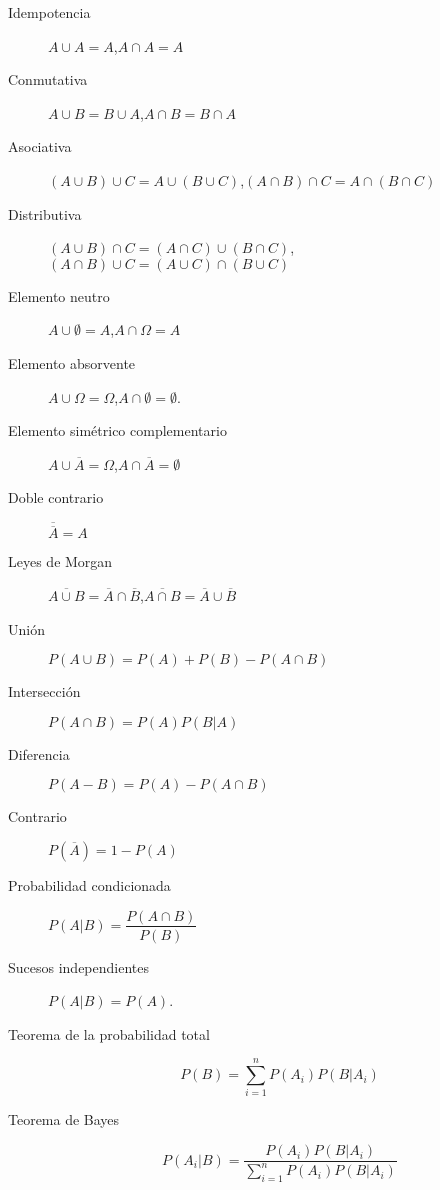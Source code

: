 \begin{multicols*}{2}
\begin{tcolorbox}[hbox, title=Álgebra de sucesos]
\begin{minipage}{0.4\textwidth}
\begin{description}
\item[Idempotencia] $A\cup A=A$,\quad $A\cap A=A$
\item[Conmutativa] $A\cup B=B\cup A$,\quad $A\cap B = B\cap A$
\item[Asociativa] $(A\cup B)\cup C = A\cup (B\cup C)$,\quad $(A\cap B)\cap C = A\cap (B\cap C)$
\item[Distributiva] $(A\cup B)\cap C = (A\cap C)\cup (B\cap C)$,\quad $(A\cap B)\cup C = (A\cup C)\cap (B\cup C)$
\item[Elemento neutro] $A\cup \emptyset=A$,\quad $A\cap \Omega=A$
\item[Elemento absorvente] $A\cup \Omega=\Omega$,\quad $A\cap \emptyset=\emptyset$.
\item[Elemento simétrico complementario] $A\cup \overline A = \Omega$,\quad $A\cap \overline A= \emptyset$
\item[Doble contrario] $\overline{\overline A} = A$
\item[Leyes de Morgan] $\overline{A\cup B} = \overline A\cap \overline B$,\quad $\overline{A\cap B} = \overline A\cup \overline B$
\end{description}
\end{minipage}
\end{tcolorbox}

\begin{tcolorbox}[hbox, title=Probabilidad básica]
\begin{minipage}{0.4\textwidth}
\begin{description}
\item [Unión] $P(A\cup B)=P(A)+P(B)-P(A\cap B)$
\item [Intersección] $P(A\cap B)=P(A)P(B|A)$
\item [Diferencia] $P(A-B)=P(A)-P(A\cap B)$
\item [Contrario] $P(\overline{A})=1-P(A)$
\end{description}
\end{minipage}
\end{tcolorbox}

\begin{tcolorbox}[hbox, title=Probabilidad condicionada]
\begin{minipage}{0.4\textwidth}
\begin{description}
\item [Probabilidad condicionada] $P(A|B)=\dfrac{P(A\cap B)}{P(B)}$
\item [Sucesos independientes] $P(A|B)=P(A)$.
\item [Teorema de la probabilidad total] \[P(B)=\sum_{i=1}^n P(A_i)P(B|A_i)\]
\item [Teorema de Bayes] \[P(A_i|B)=\dfrac{P(A_i)P(B|A_i)}{\sum_{i=1}^n P(A_i)P(B|A_i)}\]
\end{description}
\end{minipage}
\end{tcolorbox}


\end{multicols*}
